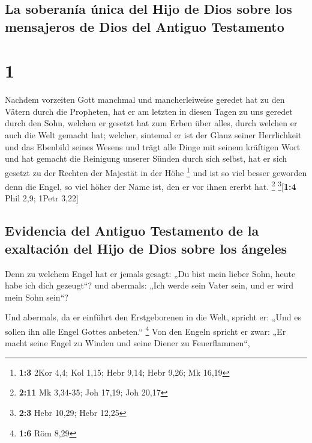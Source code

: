 \hypertarget{la-soberanuxeda-uxfanica-del-hijo-de-dios-sobre-los-mensajeros-de-dios-del-antiguo-testamento}{%
\subsection{La soberanía única del Hijo de Dios sobre los mensajeros de
Dios del Antiguo
Testamento}\label{la-soberanuxeda-uxfanica-del-hijo-de-dios-sobre-los-mensajeros-de-dios-del-antiguo-testamento}}

\hypertarget{section}{%
\section{1}\label{section}}

 Nachdem vorzeiten Gott manchmal und mancherleiweise
geredet hat zu den Vätern durch die Propheten,  hat er am
letzten in diesen Tagen zu uns geredet durch den Sohn, welchen er
gesetzt hat zum Erben über alles, durch welchen er auch die Welt gemacht
hat;  welcher, sintemal er ist der Glanz seiner
Herrlichkeit und das Ebenbild seines Wesens und trägt alle Dinge mit
seinem kräftigen Wort und hat gemacht die Reinigung unserer Sünden durch
sich selbst, hat er sich gesetzt zu der Rechten der Majestät in der Höhe
\footnote{\textbf{1:3} 2Kor 4,4; Kol 1,15; Hebr 9,14; Hebr 9,26; Mk
  16,19}  und ist so viel besser geworden denn die Engel,
so viel höher der Name ist, den er vor ihnen ererbt hat. \footnote{\textbf{2:11}
  Mk 3,34-35; Joh 17,19; Joh 20,17} \footnote{\textbf{2:3} Hebr 10,29;
  Hebr 12,25}{[}\textbf{1:4} Phil 2,9; 1Petr 3,22{]}

\hypertarget{evidencia-del-antiguo-testamento-de-la-exaltaciuxf3n-del-hijo-de-dios-sobre-los-uxe1ngeles}{%
\subsection{Evidencia del Antiguo Testamento de la exaltación del Hijo
de Dios sobre los
ángeles}\label{evidencia-del-antiguo-testamento-de-la-exaltaciuxf3n-del-hijo-de-dios-sobre-los-uxe1ngeles}}

 Denn zu welchem Engel hat er jemals gesagt: „Du bist mein
lieber Sohn, heute habe ich dich gezeugt``? und abermals: „Ich werde
sein Vater sein, und er wird mein Sohn sein``?

 Und abermals, da er einführt den Erstgeborenen in die
Welt, spricht er: „Und es sollen ihn alle Engel Gottes anbeten.``
\footnote{\textbf{1:6} Röm 8,29}  Von den Engeln spricht
er zwar: „Er macht seine Engel zu Winden und seine Diener zu
Feuerflammen``,

